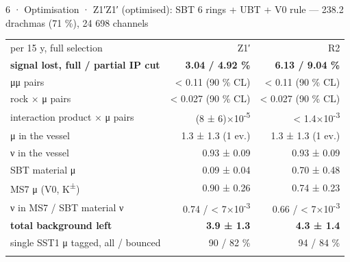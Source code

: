 \begin{btframe}{6 · Optimisation · Z1′}{Z1′ (optimised): SBT 6 rings + UBT + V0 rule — 238.2 drachmas (71 \%), 24 698 channels}
{\par}
\vspace{2.46pt}
\noindent \begin{minipage}[c]{0.5\linewidth}
{\fontsize{5.31pt}{6.90pt}\selectfont\setlength{\tabcolsep}{3.72pt}\renewcommand{\arraystretch}{1.42}
\begin{tabular}{lrr}
\textcolor{muted}{per 15 y, full selection} & \textcolor{muted}{Z1′} & \textcolor{muted}{R2} \\\headrule
\rowcolor{tint}\bfseries signal lost, full / partial IP cut & \bfseries 3.04 / 4.92 \% & \bfseries 6.13 / 9.04 \% \\\rowrule
μμ pairs & < 0.11 (90 \% CL) & < 0.11 (90 \% CL) \\\rowrule
rock × μ pairs & < 0.027 (90 \% CL) & < 0.027 (90 \% CL) \\\rowrule
interaction product × μ pairs & (8 ± 6)×10\textsuperscript{-5} & < 1.4×10\textsuperscript{-3} \\\rowrule
μ in the vessel & 1.3 ± 1.3 (1 ev.) & 1.3 ± 1.3 (1 ev.) \\\rowrule
ν in the vessel & 0.93 ± 0.09 & 0.93 ± 0.09 \\\rowrule
SBT material μ & 0.09 ± 0.04 & 0.70 ± 0.48 \\\rowrule
MS7 μ (V0, K\textsuperscript{±}) & 0.90 ± 0.26 & 0.74 ± 0.23 \\\rowrule
ν in MS7 / SBT material ν & 0.74 / < 7×10\textsuperscript{-3} & 0.66 / < 7×10\textsuperscript{-3} \\\rowrule
\rowcolor{tint}\bfseries total background left & \bfseries 3.9 ± 1.3 & \bfseries 4.3 ± 1.4 \\\rowrule
single SST1 μ tagged, all / bounced & 90 / 82 \% & 94 / 84 \% \\\rowrule
\end{tabular}\par}
\end{minipage}%
\hfill%

\end{btframe}
